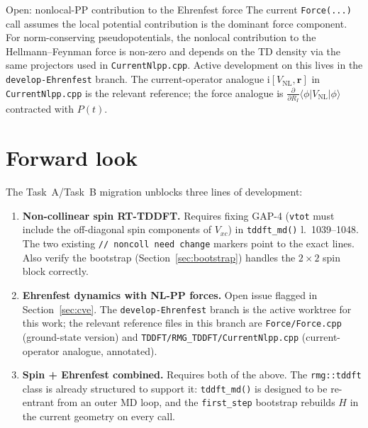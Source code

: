 \documentclass[11pt,letterpaper]{article}
\newcommand{\ii}{\mathrm{i}}
\begin{document}
\begin{infobox}{Open: nonlocal-PP contribution to the Ehrenfest force}
The current \texttt{Force(...)} call assumes the local potential
contribution is the dominant force component.  For norm-conserving
pseudopotentials, the nonlocal contribution to the Hellmann--Feynman
force is non-zero and depends on the TD density via the same projectors
used in \texttt{CurrentNlpp.cpp}.  Active development on this lives in
the \texttt{develop-Ehrenfest} branch.  The current-operator analogue
$\ii[V_\text{NL}, \mathbf{r}]$ in \texttt{CurrentNlpp.cpp} is the
relevant reference; the force analogue is
$\frac{\partial}{\partial R_I} \langle \phi | V_\text{NL} | \phi \rangle$
contracted with $P(t)$.
\end{infobox}

\section{Forward look}
\label{sec:forward}

The Task~A/Task~B migration unblocks three lines of development:

\begin{enumerate}[leftmargin=*]
\item \textbf{Non-collinear spin RT-TDDFT.}  Requires fixing GAP-4
      (\texttt{vtot} must include the off-diagonal spin components of
      $V_{xc}$) in \texttt{tddft\_md()} l.~1039--1048.  The two existing
      \texttt{// noncoll need change} markers point to the exact lines.
      Also verify the bootstrap (Section~\ref{sec:bootstrap}) handles
      the $2\times 2$ spin block correctly.

\item \textbf{Ehrenfest dynamics with NL-PP forces.}  Open issue
      flagged in Section~\ref{sec:cve}.  The
      \texttt{develop-Ehrenfest} branch is the active worktree for this
      work; the relevant reference files in this branch are
      \texttt{Force/Force.cpp} (ground-state version) and
      \texttt{TDDFT/RMG\_TDDFT/CurrentNlpp.cpp} (current-operator
      analogue, annotated).

\item \textbf{Spin + Ehrenfest combined.}  Requires both of the above.
      The \texttt{rmg::tddft} class is already structured to support
      it: \texttt{tddft\_md()} is designed to be re-entrant from an
      outer MD loop, and the \texttt{first\_step} bootstrap rebuilds
      $H$ in the current geometry on every call.
\end{enumerate}
\end{document}
